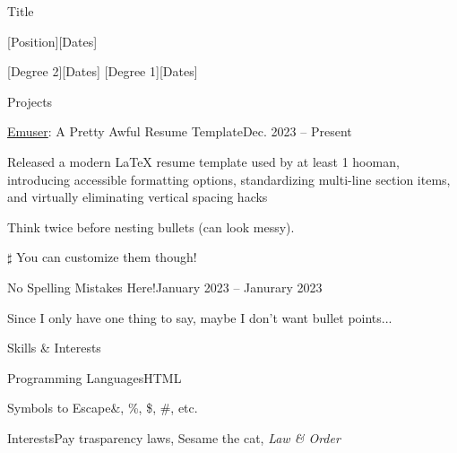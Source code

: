 \documentclass[9pt]{extarticle} %
\begin{document}
\begin{sectionList}{Title}
    \item {}
    \item {}
    \item  {}
    [Position][Dates]
    \item {}  %
    [Degree 2][Dates]
    [Degree 1][Dates]
    \item {}  %
    \item {}
\end{sectionList}

\begin{sectionList}{Projects}
    \item \lr
    {\href{https://github.com/quinnouyang/emuser}{Emuser}: A Pretty Awful Resume Template}{Dec. 2023 -- Present}
    \begin{bullets}
        \item Released a modern LaTeX resume template used by at least 1 hooman, introducing accessible formatting options, standardizing multi-line section items, and virtually eliminating vertical spacing hacks
        \begin{bullets}[$\bullet$]
            \item Think twice before nesting bullets (can look messy).
            \item[$\sharp$] You can customize them though!
        \end{bullets}
    \end{bullets}

    \item \lr
    {No Spelling Mistakes Here!}{January 2023 -- Janurary 2023}
    \begin{nobullets}
        \item Since I only have one thing to say, maybe I don't want bullet points...
    \end{nobullets}
\end{sectionList}

\begin{sectionList}{Skills \& Interests}
    \item \begin{nobullets}
        \item {}
        {Programming Languages}{HTML}
        \item {}
        {Symbols to Escape}{\&, \%, \$, \#, etc.}
        \item {}
        {Interests}{Pay trasparency laws, Sesame the cat, \textit{Law \& Order}}
    \end{nobullets}
\end{sectionList}

\dateFooter
\end{document}
